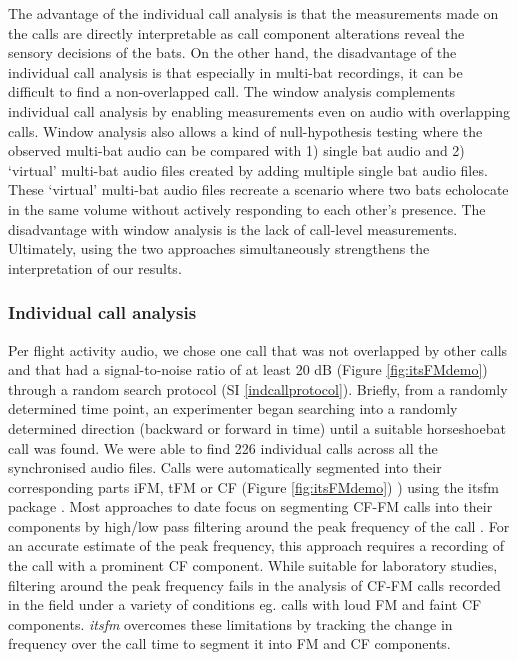 \documentclass[
]{book}
\begin{document}
The advantage of the individual call analysis is that the measurements made on the calls are directly interpretable as call component alterations reveal the sensory decisions of the bats. On the other hand, the disadvantage of the individual call analysis is that especially in multi-bat recordings, it can be difficult to find a non-overlapped call. The window analysis complements individual call analysis by enabling measurements even on audio with overlapping calls. Window analysis also allows a kind of null-hypothesis testing where the observed multi-bat audio can be compared with 1) single bat audio and 2) `virtual' multi-bat audio files created by adding multiple single bat audio files. These `virtual' multi-bat audio files recreate a scenario where two bats echolocate in the same volume without actively responding to each other's presence. The disadvantage with window analysis is the lack of call-level measurements. Ultimately, using the two approaches simultaneously strengthens the interpretation of our results.

\hypertarget{individual-call-analysis}{%
\subsubsection{Individual call analysis}\label{individual-call-analysis}}

Per flight activity audio, we chose one call that was not overlapped by other calls and that had a signal-to-noise ratio of at least 20 dB (Figure \ref{fig:itsFMdemo}) through a random search protocol (SI \ref{indcallprotocol}). Briefly, from a randomly determined time point, an experimenter began searching into a randomly determined direction (backward or forward in time) until a suitable horseshoebat call was found. We were able to find 226 individual calls across all the synchronised audio files. Calls were automatically segmented into their corresponding parts iFM, tFM or CF (Figure \ref{fig:itsFMdemo}) ) using the itsfm package \citep{itsfmcitation}. Most approaches to date focus on segmenting CF-FM calls into their components by high/low pass filtering around the peak frequency of the call \citep{siemers2005species, schuchmann2012horseshoe, tian1997echolocation, lu2020echolocating, schoeppler2018precise}. For an accurate estimate of the peak frequency, this approach requires a recording of the call with a prominent CF component. While suitable for laboratory studies, filtering around the peak frequency fails in the analysis of CF-FM calls recorded in the field under a variety of conditions eg. calls with loud FM and faint CF components. \emph{itsfm} overcomes these limitations by tracking the change in frequency over the call time to segment it into FM and CF components.
\end{document}
